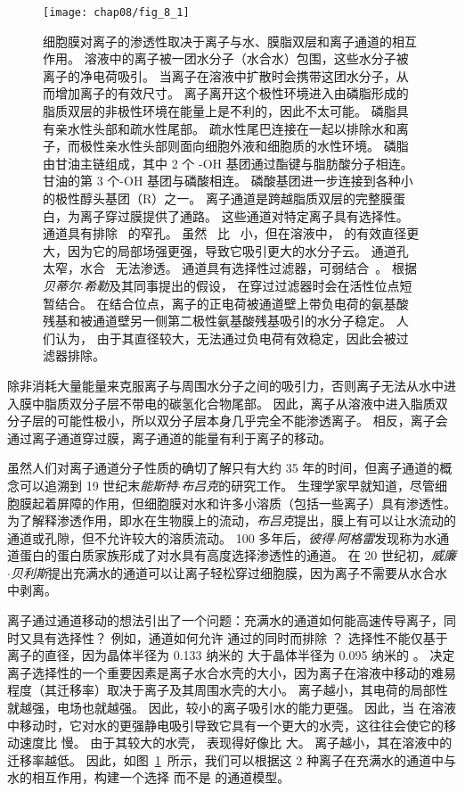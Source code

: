 \begin{figure}[htbp]
	\centering
	\texttt{[image: chap08/fig\_8\_1]}
	\caption{细胞膜对离子的渗透性取决于离子与水、膜脂双层和离子通道的相互作用。
		溶液中的离子被一团水分子（水合水）包围，这些水分子被离子的净电荷吸引。
		当离子在溶液中扩散时会携带这团水分子，从而增加离子的有效尺寸。
		离子离开这个极性环境进入由磷脂形成的脂质双层的非极性环境在能量上是不利的，因此不太可能。
		磷脂具有亲水性头部和疏水性尾部。
		疏水性尾巴连接在一起以排除水和离子，而极性亲水性头部则面向细胞外液和细胞质的水性环境。
		磷脂由甘油主链组成，其中 2 个 -OH 基团通过酯键与脂肪酸分子相连。
		甘油的第 3 个-OH 基团与磷酸相连。
		磷酸基团进一步连接到各种小的极性醇头基团（R）之一。
		离子通道是跨越脂质双层的完整膜蛋白，为离子穿过膜提供了通路。
		这些通道对特定离子具有选择性。
		通道具有排除~ 的窄孔。
		虽然~ 比~ 小，但在溶液中， 的有效直径更大，因为它的局部场强更强，导致它吸引更大的水分子云。
		 通道孔太窄，水合~ 无法渗透。
		通道具有选择性过滤器，可弱结合~。
		根据\textit{贝蒂尔$\cdot$希勒}及其同事提出的假设， 在穿过过滤器时会在活性位点短暂结合。
		在结合位点，离子的正电荷被通道壁上带负电荷的氨基酸残基和被通道壁另一侧第二极性氨基酸残基吸引的水分子稳定。
		人们认为， 由于其直径较大，无法通过负电荷有效稳定，因此会被过滤器排除。}
	\label{fig:8_1}
\end{figure}


除非消耗大量能量来克服离子与周围水分子之间的吸引力，否则离子无法从水中进入膜中脂质双分子层不带电的碳氢化合物尾部。
因此，离子从溶液中进入脂质双分子层的可能性极小，所以双分子层本身几乎完全不能渗透离子。
相反，离子会通过离子通道穿过膜，离子通道的能量有利于离子的移动。


虽然人们对离子通道分子性质的确切了解只有大约 35 年的时间，但离子通道的概念可以追溯到 19 世纪末\textit{能斯特$\cdot$布吕克}的研究工作。
生理学家早就知道，尽管细胞膜起着屏障的作用，但细胞膜对水和许多小溶质（包括一些离子）具有渗透性。
为了解释渗透作用，即水在生物膜上的流动，\textit{布吕克}提出，膜上有可以让水流动的通道或孔隙，但不允许较大的溶质流动。
100 多年后，\textit{彼得$\cdot$阿格雷}发现称为水通道蛋白的蛋白质家族形成了对水具有高度选择渗透性的通道。
在 20 世纪初，\textit{威廉$\cdot$贝利斯}提出充满水的通道可以让离子轻松穿过细胞膜，因为离子不需要从水合水中剥离。


离子通过通道移动的想法引出了一个问题：充满水的通道如何能高速传导离子，同时又具有选择性？
例如，通道如何允许  通过的同时而排除 ？
选择性不能仅基于离子的直径，因为晶体半径为 0.133 纳米的  大于晶体半径为 0.095 纳米的 。
决定离子选择性的一个重要因素是离子水合水壳的大小，因为离子在溶液中移动的难易程度（其迁移率）取决于离子及其周围水壳的大小。
离子越小，其电荷的局部性就越强，电场也就越强。
因此，较小的离子吸引水的能力更强。
因此，当  在溶液中移动时，它对水的更强静电吸引导致它具有一个更大的水壳，这往往会使它的移动速度比  慢。
由于其较大的水壳， 表现得好像比  大。
离子越小，其在溶液中的迁移率越低。
因此，如图~\ref{fig:8_1}~所示，我们可以根据这 2 种离子在充满水的通道中与水的相互作用，构建一个选择  而不是  的通道模型。


